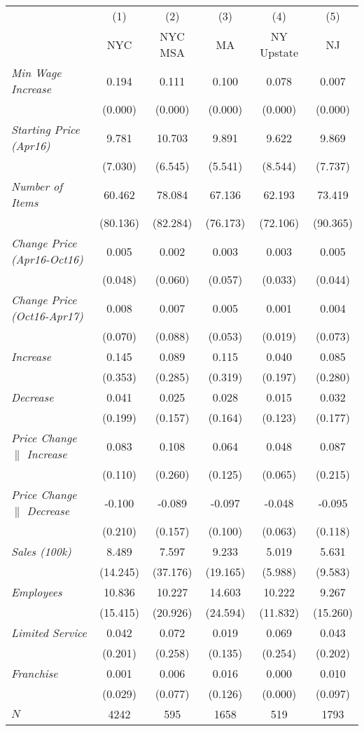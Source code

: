 \begin{center}
\begin{tabular}{lccccc}
\hline  & (1) & (2) & (3) & (4) & (5)\\
 & NYC & NYC MSA & MA & NY Upstate & NJ\\
\hline  \textit{Min Wage Increase}  & 0.194 & 0.111 & 0.100 & 0.078 & 0.007\\
  & (0.000) & (0.000) & (0.000) & (0.000) & (0.000)\\
 \textit{Starting Price (Apr16)}  & 9.781 & 10.703 & 9.891 & 9.622 & 9.869\\
  & (7.030) & (6.545) & (5.541) & (8.544) & (7.737)\\
 \textit{Number of Items}  & 60.462 & 78.084 & 67.136 & 62.193 & 73.419\\
  & (80.136) & (82.284) & (76.173) & (72.106) & (90.365)\\
 \textit{Change Price (Apr16-Oct16)}  & 0.005 & 0.002 & 0.003 & 0.003 & 0.005\\
  & (0.048) & (0.060) & (0.057) & (0.033) & (0.044)\\
 \textit{Change Price (Oct16-Apr17)}  & 0.008 & 0.007 & 0.005 & 0.001 & 0.004\\
  & (0.070) & (0.088) & (0.053) & (0.019) & (0.073)\\
 \textit{Increase}  & 0.145 & 0.089 & 0.115 & 0.040 & 0.085\\
  & (0.353) & (0.285) & (0.319) & (0.197) & (0.280)\\
 \textit{Decrease}  & 0.041 & 0.025 & 0.028 & 0.015 & 0.032\\
  & (0.199) & (0.157) & (0.164) & (0.123) & (0.177)\\
 \textit{Price Change $\|$ Increase}  & 0.083 & 0.108 & 0.064 & 0.048 & 0.087\\
  & (0.110) & (0.260) & (0.125) & (0.065) & (0.215)\\
 \textit{Price Change $\|$ Decrease}  & -0.100 & -0.089 & -0.097 & -0.048 & -0.095\\
  & (0.210) & (0.157) & (0.100) & (0.063) & (0.118)\\
 \textit{Sales (100k)}  & 8.489 & 7.597 & 9.233 & 5.019 & 5.631\\
  & (14.245) & (37.176) & (19.165) & (5.988) & (9.583)\\
 \textit{Employees} & 10.836 & 10.227 & 14.603 & 10.222 & 9.267\\
  & (15.415) & (20.926) & (24.594) & (11.832) & (15.260)\\
 \textit{Limited Service}  & 0.042 & 0.072 & 0.019 & 0.069 & 0.043\\
  & (0.201) & (0.258) & (0.135) & (0.254) & (0.202)\\
 \textit{Franchise}  & 0.001 & 0.006 & 0.016 & 0.000 & 0.010\\
  & (0.029) & (0.077) & (0.126) & (0.000) & (0.097)\\
\hline  $ N $  & 4242 & 595 & 1658 & 519 & 1793\\
\hline\end{tabular}\\
\end{center}
